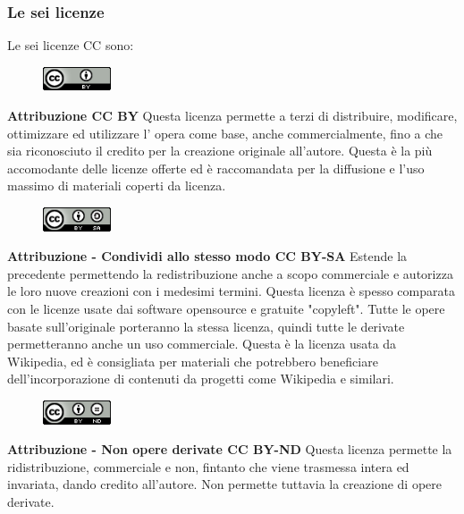 \subsubsection{Le sei licenze}
Le sei licenze CC sono:

\begin{figure}
    \includegraphics[width=20mm]{images/cc_by}
\end{figure}

\noindent \textbf{Attribuzione CC BY} Questa licenza permette a terzi di distribuire, modificare, ottimizzare ed utilizzare l' opera come base, anche commercialmente, fino a che sia riconosciuto il credito per la creazione originale all'autore. Questa è la più accomodante delle licenze offerte ed è raccomandata per la diffusione e l'uso massimo di materiali coperti da licenza.\\
\begin{figure}
    \includegraphics[width=20mm]{images/cc_by_sa}
\end{figure}

\noindent \textbf{Attribuzione - Condividi allo stesso modo CC BY-SA} Estende la precedente permettendo la redistribuzione anche a scopo commerciale e autorizza le loro nuove creazioni con i medesimi termini. Questa licenza è spesso comparata con le licenze usate dai software opensource e gratuite "copyleft". Tutte le opere basate sull'originale porteranno la stessa licenza, quindi tutte le derivate permetteranno anche un uso commerciale. Questa è la licenza usata da Wikipedia, ed è consigliata per materiali che potrebbero beneficiare dell'incorporazione di contenuti da progetti come Wikipedia e similari.\\

\begin{figure}
    \includegraphics[width=20mm]{images/cc_by_nd}
\end{figure}

\noindent \textbf{Attribuzione - Non opere derivate CC BY-ND} Questa licenza permette la ridistribuzione, commerciale e non, fintanto che viene trasmessa intera ed invariata, dando credito all'autore. Non permette tuttavia la creazione di opere derivate.\\

